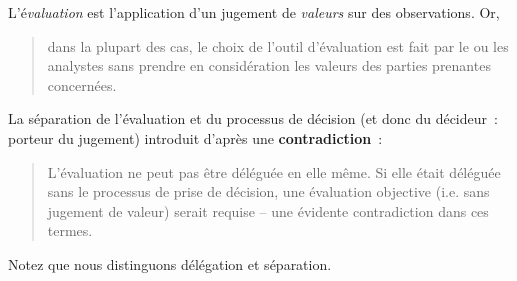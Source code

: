L'é\emph{valuation} est l'application d'un jugement de \emph{valeurs} sur des observations.
Or,\blockcquote[traduction]{gasparatos_embeded_2010}{dans la plupart des cas, le choix de l'outil d'évaluation est fait par le ou les analystes sans prendre en considération les valeurs des parties prenantes concernées.}
La séparation de l'évaluation et du processus de décision (et donc du décideur~: porteur du jugement) introduit d'après \citeauthor{grahl_evaluation_1996} une \textbf{contradiction}~:
\blockcquote{grahl_evaluation_1996}{L'évaluation ne peut pas être déléguée en elle même. Si elle était déléguée sans le processus de prise de décision, une évaluation objective (i.e. sans jugement de valeur) serait requise -- une évidente contradiction dans ces termes.}
\label{grahl_impossible_deleguation}
Notez que nous distinguons délégation et séparation.
